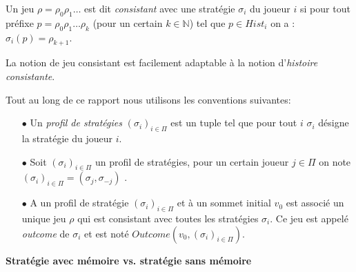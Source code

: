 \begin{defi}	
	Un jeu $\rho = \rho _{0}  \rho _{1} \ldots$ est dit \textit{consistant} avec une stratégie $\sigma _{i}$ du joueur $i$ si pour tout préfixe $p = \rho _{0}\rho _{1}\ldots \rho _{k}$ (pour un certain $k \in \mathbb{N}$) tel que $p \in Hist_{i}$ on a : $\sigma _{i}(p) = \rho_{k+1}$.	
\end{defi}

\begin{rem}
	La notion de jeu consistant est facilement adaptable à la notion d'\textit{histoire consistante}.
\end{rem}

\begin{notations}
	Tout au long de ce rapport nous utilisons les conventions suivantes:
	\begin{enumerate}
		\item[$\bullet$] Un \textit{profil de stratégies} $(\sigma _{i})_{i \in \Pi}$ est un tuple tel que pour tout $i$ $\sigma _{i}$ désigne la stratégie du 	joueur $i$. 
				
		\item[$\bullet$] Soit  $(\sigma _{i})_{i \in \Pi}$ un profil de stratégies, pour un certain joueur $j\in \Pi $ on note $(\sigma _{i})_{i \in \Pi} = ( \sigma _{j},\sigma _{-j})$ .
		
		\item[$\bullet$] A un profil de stratégie $(\sigma _{i})_{i \in \Pi}$ et à un sommet initial $v_{0}$ est associé un unique jeu $\rho$ qui est consistant avec toutes les stratégies $\sigma _{i}$. Ce jeu est appelé \textit{outcome} de $\sigma _{i}$ et est noté $Outcome(v_{0},(\sigma _{i})_{i\in \Pi})$.
		
	\end{enumerate}
\end{notations}
		



\noindent\textbf{Stratégie avec mémoire vs. stratégie sans mémoire}\\
\todo{}

